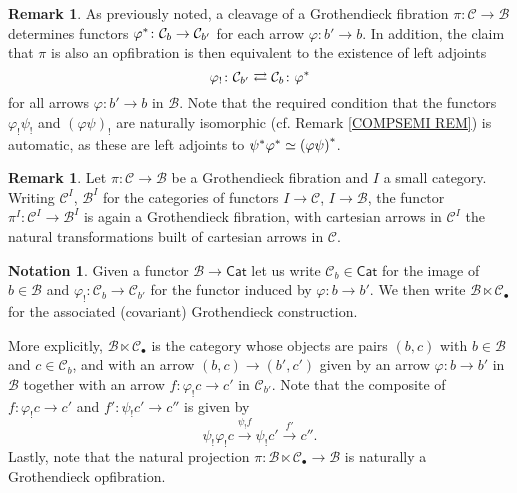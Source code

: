 \documentclass[a4paper,10pt
,draft
]{article}%
\numberwithin{equation}{section}
\numberwithin{figure}{section}
\theoremstyle{definition} %
\newtheorem{remark}[equation]{Remark}%
\newtheorem{notation}[equation]{Notation}%
\newcommand{\1}{\ensuremath{\mathbbm 1}}%
\begin{document}
\begin{remark}\label{ALSOOPADJ REM}
	As previously noted, a cleavage of a Grothendieck fibration $\pi \colon \mathcal{C} \to \mathcal{B}$ determines functors 
	$\varphi^{\**} \colon \mathcal{C}_b \to \mathcal{C}_{b'}$
	for each arrow $\varphi \colon b' \to b$.
In addition, 
the claim that $\pi$ is also an opfibration is then equivalent to the existence of left adjoints
\[
	\varphi_! \colon
	\mathcal{C}_{b'}
	\rightleftarrows
	\mathcal{C}_{b}
	\colon \varphi^{\**}
\]
for all arrows $\varphi \colon b' \to b$ in $\mathcal{B}$.
%
Note that the required condition that the functors
$\varphi_! \psi_!$ and
$(\varphi \psi)_!$
are naturally isomorphic (cf. Remark \ref{COMPSEMI REM})
is automatic, 
as these are left adjoints to 
$\psi^{\**} \varphi^{\**} \simeq 
\left( \varphi \psi \right)^{\**}$.
\end{remark}


\begin{remark}\label{FUNISGROTH REM}
Let $\pi \colon \mathcal{C} \to \mathcal{B}$
be a Grothendieck fibration and
$I$ a small category.
Writing $\mathcal{C}^{I}$, $\mathcal{B}^{I}$ for the categories of functors 
$I \to \mathcal{C}$, $I \to \mathcal{B}$,
the functor
$\pi^I \colon \mathcal{C}^I \to \mathcal{B}^I$
is again a Grothendieck fibration, with cartesian arrows in $\mathcal{C}^I$ the natural transformations built of cartesian arrows in $\mathcal{C}$.
\end{remark}





\begin{notation}\label{GROTHCONS NOT}
Given a functor $\mathcal{B} \to \mathsf{Cat}$
let us write
$\mathcal{C}_b \in \mathsf{Cat}$
for the image of $b \in \mathcal{B}$ and 
$\varphi_! \colon \mathcal{C}_{b} \to \mathcal{C}_{b'}$
for the functor induced by
$\varphi \colon b \to b'$.
%
We then write 
$\mathcal{B} \ltimes \mathcal{C}_{\bullet}$
for the associated (covariant) Grothendieck construction.

More explicitly, $\mathcal{B} \ltimes \mathcal{C}_{\bullet}$ is
the category whose objects are pairs 
$(b,c)$ with $b \in \mathcal{B}$ and $c \in \mathcal{C}_b$,
and with an arrow
$(b,c) \to (b',c')$
given by an arrow 
$\varphi \colon b \to b'$ in $\mathcal{B}$
together with an arrow
$f \colon \varphi_! c \to c'$ in $\mathcal{C}_{b'}$.
%
Note that the composite of 
$f \colon \varphi_! c \to c'$ and
$f' \colon \psi_! c' \to c''$ is given by
\[
\psi_! \varphi_! c \xrightarrow{\psi_!f}
\psi_! c' \xrightarrow{f'}
 c''.
\]
Lastly, note that the natural projection
$\pi \colon \mathcal{B} \ltimes \mathcal{C}_{\bullet} \to \mathcal{B}$
is naturally a Grothendieck opfibration.
\end{notation}
\end{document}
